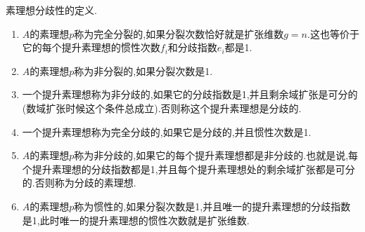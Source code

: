 素理想分歧性的定义.
\begin{enumerate}
	\item $A$的素理想$p$称为完全分裂的,如果分裂次数恰好就是扩张维数$g=n$.这也等价于它的每个提升素理想的惯性次数$f_i$和分歧指数$e_i$都是1.
	\item $A$的素理想$p$称为非分裂的,如果分裂次数是1.
	\item 一个提升素理想称为非分歧的,如果它的分歧指数是1,并且剩余域扩张是可分的(数域扩张时候这个条件总成立).否则称这个提升素理想是分歧的.
	\item 一个提升素理想称为完全分歧的,如果它是分歧的,并且惯性次数是1.
	\item $A$的素理想$p$称为非分歧的,如果它的每个提升素理想都是非分歧的.也就是说,每个提升素理想的分歧指数都是1,并且每个提升素理想处的剩余域扩张都是可分的.否则称为分歧的素理想.
	\item $A$的素理想$p$称为惯性的,如果分裂次数是1,并且唯一的提升素理想的分歧指数是1,此时唯一的提升素理想的惯性次数就是扩张维数.
\end{enumerate}

